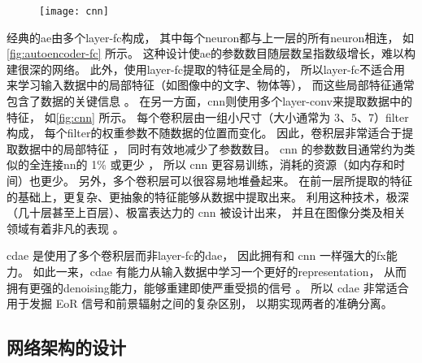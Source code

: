 \begin{figure}[htp]
  \centering
  \texttt{[image: cnn]}
  \label{fig:cnn}
\end{figure}

经典的\ac{ae}由多个\ac{layer-fc}构成，
其中每个\ac{neuron}都与上一层的所有\ac{neuron}相连，
如\autoref{fig:autoencoder-fc} 所示。
这种设计使\ac{ae}的参数数目随层数呈指数级增长，难以构建很深的网络。
此外，使用\ac{layer-fc}提取的特征是全局的，
所以\ac{layer-fc}不适合用来学习输入数据中的局部特征（如图像中的文字、物体等），
而这些局部特征通常包含了数据的关键信息 \cite{masci2011}。
在另一方面，\ac{cnn}则使用多个\ac{layer-conv}来提取数据中的特征，
如\autoref{fig:cnn} 所示。
每个卷积层由一组小尺寸（大小通常为 3、5、7）\ac{filter}构成，
每个\ac{filter}的权重参数不随数据的位置而变化。
因此，卷积层非常适合于提取数据中的局部特征 \cite{leCun1998}，
同时有效地减少了参数数目。
\ac{cnn} 的参数数目通常约为类似的全连接\ac{nn}的 1\% 或更少 \cite{grais2017}，
所以 \ac{cnn} 更容易训练，消耗的资源（如内存和时间）也更少。
另外，多个卷积层可以很容易地堆叠起来。
在前一层所提取的特征的基础上，更复杂、更抽象的特征能够从数据中提取出来。
利用这种技术，极深（几十层甚至上百层）、极富表达力的 \ac{cnn} 被设计出来，
并且在图像分类及相关领域有着非凡的表现
\cite{krizhevsky2012,simonyan2014,szegedy2015,ma2019}。

\ac{cdae} 是使用了多个卷积层而非\ac{layer-fc}的\ac{dae}，
因此拥有和 \ac{cnn} 一样强大的\ac{fx}能力。
如此一来，\ac{cdae} 有能力从输入数据中学习一个更好的\ac{representation}，
从而拥有更强的\ac{denoising}能力，能够重建即使严重受损的信号 \cite{du2017}。
所以 \ac{cdae} 非常适合用于发掘 EoR 信号和前景辐射之间的复杂区别，
以期实现两者的准确分离。

\subsection{网络架构的设计}
\label{sec:architecture}

